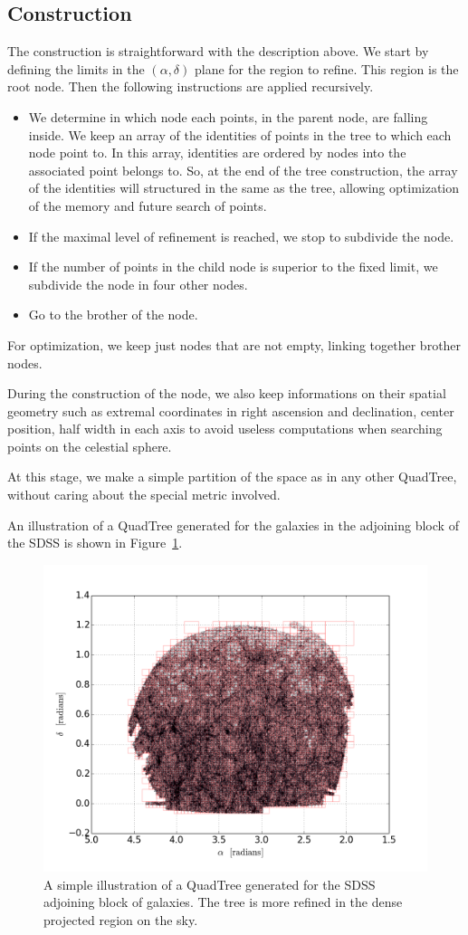 \subsection{Construction}
%
The construction is straightforward with the description above. We start by
defining the limits in the $(\alpha, \delta)$ plane for the region to
refine. This region is the root node. Then the following instructions are
applied recursively.
%
\begin{itemize}
    \item We determine in which node each points, in the parent node, are
        falling inside. We keep an array of the identities of points in the
        tree to which each node point to. In this array, identities are
        ordered by nodes into the associated point belongs to. So, at the
        end of the tree construction, the array of the identities will
        structured in the same as the tree, allowing optimization of the
        memory and future search of points.
    \item If the maximal level of refinement is reached, we stop to subdivide
        the node.
    \item If the number of points in the child node is superior to the fixed
        limit, we subdivide the node in four other nodes.
    \item Go to the brother of the node.
\end{itemize}
%
For optimization, we keep just nodes that are not empty, linking together
brother nodes.

During the construction of the node, we also keep informations on their
spatial geometry such as extremal coordinates in right ascension and
declination, center position, half width in each axis to avoid useless
computations when searching points on the celestial sphere.

At this stage, we make a simple partition of the space as in any other
QuadTree, without caring about the special metric involved.

An illustration of a QuadTree generated for the galaxies in the adjoining
block of the SDSS is shown in Figure~\ref{fig:quadtree}.
%
\begin{figure}
    \centering
    \includegraphics[width=0.7\linewidth]{figures/appendix/quadtree/quadtree.png}
    \caption{A simple illustration of a QuadTree generated for the SDSS
        adjoining block of galaxies. The tree is more refined in the dense projected
    region on the sky.\label{fig:quadtree}}
\end{figure}
%
